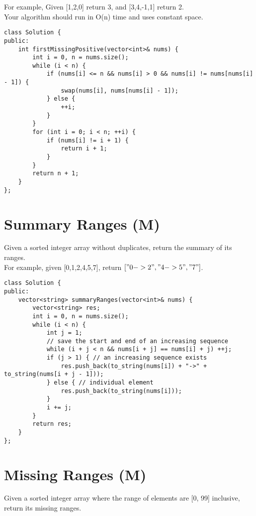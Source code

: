 For example,
Given [1,2,0] return 3,
and [3,4,-1,1] return 2.\\

Your algorithm should run in O(n) time and uses constant space. \\

\begin{lstlisting}
class Solution {
public:
    int firstMissingPositive(vector<int>& nums) {
        int i = 0, n = nums.size();
        while (i < n) {
            if (nums[i] <= n && nums[i] > 0 && nums[i] != nums[nums[i] - 1]) {
                swap(nums[i], nums[nums[i] - 1]);
            } else {
                ++i;
            }
        }
        for (int i = 0; i < n; ++i) {
            if (nums[i] != i + 1) {
                return i + 1;
            }
        }
        return n + 1;
    }
};
\end{lstlisting}


\section{Summary Ranges (M)}
Given a sorted integer array without duplicates, return the summary of its ranges.\\

For example, given [0,1,2,4,5,7], return $["0->2","4->5","7"]$.\\

\begin{lstlisting}
class Solution {
public:
    vector<string> summaryRanges(vector<int>& nums) {
        vector<string> res;
        int i = 0, n = nums.size();
        while (i < n) {
            int j = 1;
            // save the start and end of an increasing sequence
            while (i + j < n && nums[i + j] == nums[i] + j) ++j;
            if (j > 1) { // an increasing sequence exists
                res.push_back(to_string(nums[i]) + "->" + to_string(nums[i + j - 1]));
            } else { // individual element
                res.push_back(to_string(nums[i]));
            }
            i += j;
        }
        return res;
    }
};
\end{lstlisting}


\section{Missing Ranges (M)}
Given a sorted integer array where the range of elements are [0, 99] inclusive, return its missing ranges.\\

